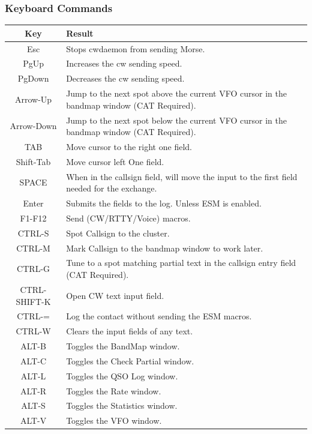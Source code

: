 \documentclass{article}
\begin{document}
\subsubsection{Keyboard Commands}

\begin{tabular}{| c | p{9cm} |}
    \hline
    \textbf{Key} & \textbf{Result} \\
    \hline
    Esc & Stops cwdaemon from sending Morse.\\
    \hline
    PgUp & Increases the cw sending speed. \\
    \hline
    PgDown & Decreases the cw sending speed. \\
    \hline
    Arrow-Up & Jump to the next spot above the current VFO cursor in the bandmap window (CAT Required). \\
    \hline
    Arrow-Down & Jump to the next spot below the current VFO cursor in the bandmap window (CAT Required). \\
    \hline
    TAB & Move cursor to the right one field. \\
    \hline
    Shift-Tab & Move cursor left One field. \\
    \hline
    SPACE & When in the callsign field, will move the input to the first field needed for the exchange. \\
    \hline
    Enter & Submits the fields to the log. Unless ESM is enabled. \\
    \hline
    F1-F12 & Send (CW/RTTY/Voice) macros. \\
    \hline
    CTRL-S & Spot Callsign to the cluster. \\
    \hline
    CTRL-M & Mark Callsign to the bandmap window to work later. \\
    \hline
    CTRL-G & Tune to a spot matching partial text in the callsign entry field (CAT Required). \\
    \hline
    CTRL-SHIFT-K & Open CW text input field. \\
    \hline
    CTRL-= & Log the contact without sending the ESM macros. \\
    \hline
    CTRL-W & Clears the input fields of any text. \\
    \hline
    ALT-B	& Toggles the BandMap window. \\
    \hline
    ALT-C	& Toggles the Check Partial window. \\
    \hline
    ALT-L	& Toggles the QSO Log window. \\
    \hline
    ALT-R	& Toggles the Rate window. \\
    \hline
    ALT-S	& Toggles the Statistics window. \\
    \hline
    ALT-V	& Toggles the VFO window. \\
    \hline
\end{tabular}
\end{document}
